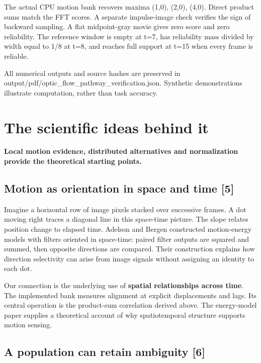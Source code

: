 \documentclass[11pt,letterpaper]{article}
\begin{document}
The actual CPU motion bank recovers maxima (1,0), (2,0), (4,0). Direct product sums match the FFT scores. A separate impulse-image check verifies the sign of backward sampling. A flat midpoint-gray movie gives zero score and zero reliability. The reference window is empty at t=7, has reliability mass divided by width equal to 1/\allowbreak{}8 at t=8, and reaches full support at t=15 when every frame is reliable.


{
\small\color{muted} All numerical outputs and source hashes are preserved in output/\allowbreak{}pdf/\allowbreak{}optic\_flow\_pathway\_verification.json. Synthetic demonstrations illustrate computation, rather than task accuracy.\par}


\clearpage

\section{The scientific ideas behind it}\label{sec16}

\textbf{Local motion evidence, distributed alternatives and normalization provide the theoretical starting points.}


\subsection*{Motion as orientation in space and time [5]}

Imagine a horizontal row of image pixels stacked over successive frames. A dot moving right traces a diagonal line in this space-time picture. The slope relates position change to elapsed time. Adelson and Bergen constructed motion-energy models with filters oriented in space-time: paired filter outputs are squared and summed, then opposite directions are compared. Their construction explains how direction selectivity can arise from image signals without assigning an identity to each dot.


Our connection is the underlying use of \textbf{spatial relationships across time}. The implemented bank measures alignment at explicit displacements and lags. Its central operation is the product-sum correlation derived above. The energy-model paper supplies a theoretical account of why spatiotemporal structure supports motion sensing.


\subsection*{A population can retain ambiguity [6]}
\end{document}
